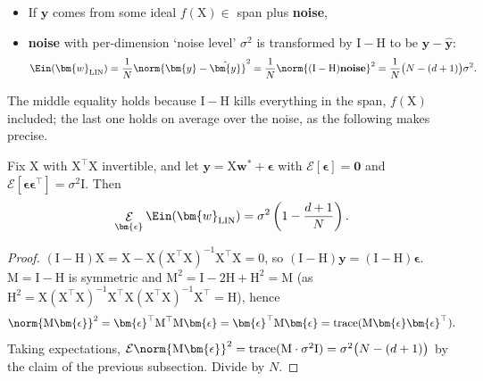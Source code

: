 \begin{itemize}
    \item If \(\bm{y}\) comes from some ideal \(f(\mathrm{X}) \in\) span plus
        \textbf{noise},
    \item \textbf{noise} with per-dimension `noise level' \(\sigma^2\) is
        transformed by \(\mathrm{I} - \mathrm{H}\) to be \(\bm{y} -
        \hat{\bm{y}}\):
        \[
            \Ein(\bm{w}_{\mathrm{LIN}}) = \frac{1}{N} \norm{\bm{y} -
            \hat{\bm{y}}}^2 = \frac{1}{N} \norm{(\mathrm{I} - \mathrm{H})
            \textbf{noise}}^2 = \frac{1}{N} \bigl( N - (d+1) \bigr) \sigma^2 .
        \]
\end{itemize}

The middle equality holds because \(\mathrm{I} - \mathrm{H}\) kills
everything in the span, \(f(\mathrm{X})\) included; the last one holds on
average over the noise, as the following makes precise.

\begin{proposition}
    \label{prop:linreg-ein}
    Fix \(\mathrm{X}\) with \(\mathrm{X}^\top \mathrm{X}\) invertible, and let
    \(\bm{y} = \mathrm{X} \bm{w}^* + \bm{\epsilon}\) with
    \(\mathcal{E}[\bm{\epsilon}] = \bm{0}\) and \(\mathcal{E}[\bm{\epsilon}
    \bm{\epsilon}^\top] = \sigma^2 \mathrm{I}\). Then
    \[
        \mathop{\mathcal{E}}_{\bm{\epsilon}} \Ein(\bm{w}_{\mathrm{LIN}}) =
        \sigma^2 \left( 1 - \frac{d+1}{N} \right) .
    \]
\end{proposition}

\begin{proof}
    \((\mathrm{I} - \mathrm{H}) \mathrm{X} = \mathrm{X} - \mathrm{X}
    (\mathrm{X}^\top \mathrm{X})^{-1} \mathrm{X}^\top \mathrm{X} = 0\), so
    \((\mathrm{I} - \mathrm{H}) \bm{y} = (\mathrm{I} - \mathrm{H})
    \bm{\epsilon}\). \(\mathrm{M} = \mathrm{I} - \mathrm{H}\) is symmetric and
    \(\mathrm{M}^2 = \mathrm{I} - 2\mathrm{H} + \mathrm{H}^2 = \mathrm{M}\)
    (as \(\mathrm{H}^2 = \mathrm{X} (\mathrm{X}^\top \mathrm{X})^{-1}
    \mathrm{X}^\top \mathrm{X} (\mathrm{X}^\top \mathrm{X})^{-1}
    \mathrm{X}^\top = \mathrm{H}\)), hence
    \[
        \norm{\mathrm{M} \bm{\epsilon}}^2 = \bm{\epsilon}^\top \mathrm{M}^\top
        \mathrm{M} \bm{\epsilon} = \bm{\epsilon}^\top \mathrm{M} \bm{\epsilon}
        = \operatorname{trace}(\mathrm{M} \bm{\epsilon} \bm{\epsilon}^\top) .
    \]
    Taking expectations, \(\mathcal{E} \norm{\mathrm{M} \bm{\epsilon}}^2 =
    \operatorname{trace}(\mathrm{M} \cdot \sigma^2 \mathrm{I}) = \sigma^2
    \bigl( N - (d+1) \bigr)\) by the claim of the previous subsection. Divide
    by \(N\).
\end{proof}

